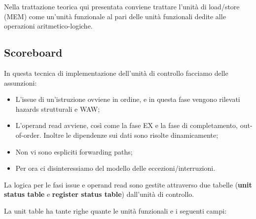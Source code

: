 Nella trattazione teorica qui presentata conviene trattare l'unità di load/store (MEM) come un'unità funzionale al pari delle unità funzionali dedite alle operazioni aritmetico-logiche. 

\subsection{Scoreboard}
In questa tecnica di implementazione dell'unità di controllo facciamo delle assunzioni: 
\begin{itemize}
    \item L'issue di un'istruzione ovviene in ordine, e in questa fase vengono rilevati hazards strutturali e WAW;
    \item L'operand read avviene, così come la fase EX e la fase di completamento, out-of-order. Inoltre le dipendenze sui dati sono risolte dinamicamente;
    \item Non vi sono espliciti forwarding paths;
    \item Per ora ci disinteressiamo del modello delle eccezioni/interruzioni.
\end{itemize}

La logica per le fasi issue e operand read sono gestite attraverso due tabelle (\textbf{unit status table} e \textbf{register status table}) dall'unità di controllo.

\begin{figure}[ht]
    \centering
    \setlength{\fboxrule}{0.5pt} %
    \setlength{\fboxsep}{0pt}    %
\end{figure}

\noindent La unit table ha tante righe quante le unità funzionali e i seguenti campi:

